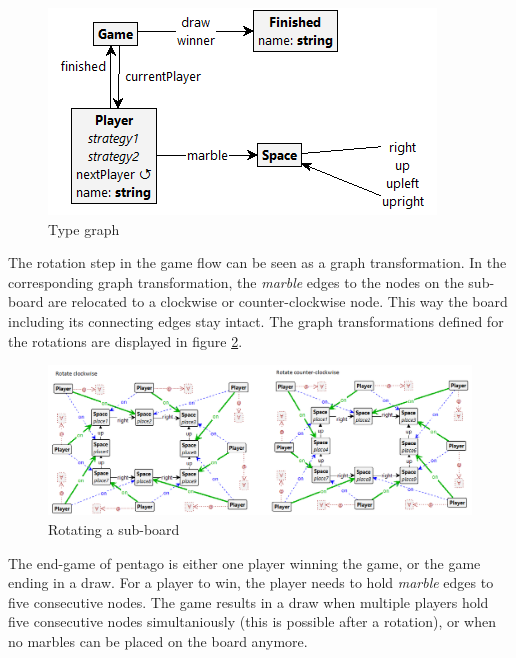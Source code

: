 \begin{figure}[h]
    \centering
    \includegraphics[scale=0.5,clip]{Images/typegraph_puregraphmodel.png}
    \caption{Type graph}
    \label{fig:type_graph_pure_graph}
\end{figure}

\vspace{6pt}

The rotation step in the game flow can be seen as a graph transformation.
In the corresponding graph transformation, the \textit{marble} edges to the nodes on the sub-board are relocated to a clockwise or counter-clockwise node.
This way the board including its connecting edges stay intact.
The graph transformations defined for the rotations are displayed in figure \ref{fig:rotate1}.

\begin{figure}[h]
    \centering
    \includegraphics[scale=0.45,clip]{Images/rotate1.png}
    \caption{Rotating a sub-board}
    \label{fig:rotate1}
\end{figure}

\vspace{6pt}

The end-game of pentago is either one player winning the game, or the game ending in a draw.
For a player to win, the player needs to hold \textit{marble} edges to five consecutive nodes.
The game results in a draw when multiple players hold five consecutive nodes simultaniously (this is possible after a rotation), or when no marbles can be placed on the board anymore.


